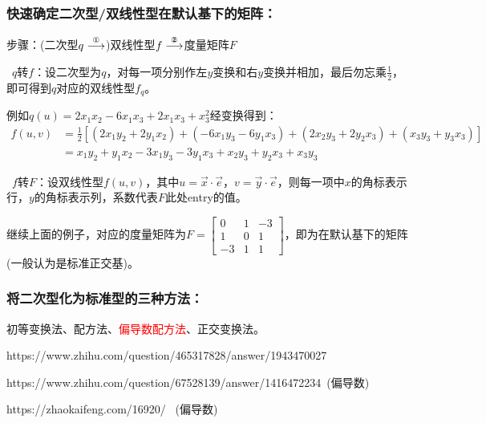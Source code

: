 \documentclass[zihao=5,UTF8]{report}
\theoremstyle{mystyle} %
\begin{document}
\subsubsection{快速确定二次型/双线性型在默认基下的矩阵：}
步骤：(二次型$q\overset{\text{\ding{172}}}{\longrightarrow}$)双线性型$f\overset{\text{\ding{173}}}{\longrightarrow}$度量矩阵$F$\par
{}\ $q$转$f$：设二次型为$q$，对每一项分别作左$y$变换和右$y$变换并相加，最后{\color{red}勿忘乘$\frac{1}{2}$}，即可得到$q$对应的双线性型$f_q$。\par{\color{gray}\small 例如$q(u) = 2x_1x_2 -6x_1x_3+2x_1x_3+x_3^2$经变换得到：
\begin{align*}
    f(u,v) &= \frac{1}{2}\left[(2x_1y_2 + 2y_1x_2)+(-6x_1y_3-6y_1x_3)+(2x_2y_3+2y_2x_3)+(x_3y_3 +y_3x_3) \right]\\
    & = x_1y_2 + y_1x_2 -3x_1y_3-3y_1x_3 +x_2y_3+y_2x_3 +x_3y_3
\end{align*}\noindent
}\par
{}\ $f$转$F$：设双线性型$f(u,v)$，其中$u = \vec{x}\cdot \vec{e}$，$v =\vec{y}\cdot \vec{e}$，则每一项中$x$的角标表示行，$y$的角标表示列，系数代表$F$此处entry的值。\par 
{\color{gray}\small 继续上面的例子，对应的度量矩阵为$F = 
\begin{bmatrix}  
    0 & 1 & -3 \\  
    1 & 0 & 1 \\  
    -3 & 1 & 1  
  \end{bmatrix} $，即为在默认基下的矩阵(一般认为是标准正交基)。}

\subsubsection{将二次型化为标准型的三种方法：}
初等变换法、配方法、\textcolor{red}{偏导数配方法}、正交变换法。\par 
https://www.zhihu.com/question/465317828/answer/1943470027 \par
https://www.zhihu.com/question/67528139/answer/1416472234\ (偏导数)\par
https://zhaokaifeng.com/16920/ \ (偏导数)\par
\end{document}

